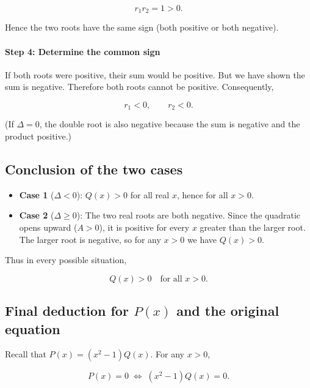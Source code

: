 \documentclass{article}
\begin{document}
\begin{equation}
r_1r_2=1>0.
\tag{21}
\end{equation}

Hence the two roots have the same sign (both positive or both negative).

\paragraph{Step 4: Determine the common sign}

If both roots were positive, their sum would be positive. But we have shown the sum is negative. Therefore both roots cannot be positive. Consequently,

\begin{equation}
r_1<0,
\qquad
r_2<0.
\tag{22}
\end{equation}

(If \(\Delta=0\), the double root is also negative because the sum is negative and the product positive.)

\subsection*{Conclusion of the two cases}

\begin{itemize}
\item \textbf{Case 1} (\(\Delta<0\)): \(Q(x)>0\) for all real \(x\), hence for all \(x>0\).

\item \textbf{Case 2} (\(\Delta\ge0\)): The two real roots are both negative. Since the quadratic opens upward (\(A>0\)), it is positive for every \(x\) greater than the larger root. The larger root is negative, so for any \(x>0\) we have \(Q(x)>0\).
\end{itemize}

Thus in every possible situation,

\begin{equation}
Q(x) > 0
\quad \text{for all } x > 0.
\tag{23}
\end{equation}

\subsection*{Final deduction for \(P(x)\) and the original equation}

Recall that \(P(x)=(x^2-1)Q(x)\). For any \(x>0\),

\begin{equation}
P(x)=0
\;\Longleftrightarrow\;
(x^2-1)Q(x)=0.
\tag{24}
\end{equation}
\end{document}
